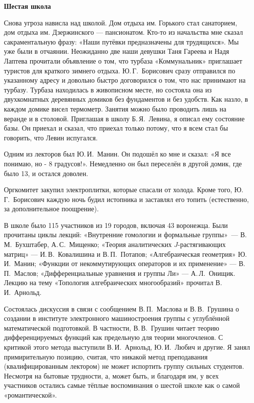 {\bf Шестая школа}

Снова угроза нависла над школой. Дом отдыха им. Горького стал санаторием, дом отдыха им. Дзержинского --- пансионатом. Кто-то из начальства мне сказал сакраментальную фразу: «Наши путёвки предназначены для трудящихся». Мы уже были в отчаянии. Неожиданно две наши девушки Таня Гареева и Надя Лаптева прочитали объявление о том, что турбаза «Коммунальник» приглашает туристов для краткого зимнего отдыха. Ю.\,Г.~Борисович сразу отправился по указанному адресу и довольно быстро договорился о том, что нас принимают на турбазу. Турбаза находилась в живописном месте, но состояла она из двухкомнатных деревянных домиков без фундаментов и без удобств. Как назло, в каждом домике висел термометр. Занятия можно было проводить лишь на веранде и в столовой. Приглашая в школу Б.\,Я.~Левина, я описал ему состояние базы. Он приехал и сказал, что приехал только потому, что я всем стал бы говорить, что Левин испугался.

Одним из лекторов был Ю.\,И.~Манин. Он подошёл ко мне и сказал: «Я все понимаю, но - 8 градусов!». Немедленно он был переселён в другой домик, где было 13, и остался доволен.

Оргкомитет закупил электроплитки, которые спасали от холода. Кроме того, Ю.\,Г.~Борисович каждую ночь будил истопника и заставлял его топить (естественно, за дополнительное поощрение).

В школе было 115 участников из 19 городов, включая 43 воронежца.
Были прочитаны циклы лекций: «Внутренние гомологии и формальные группы»~--- В.\,М.~Бухштабер, А.\,С.~Мищенко;
«Теория аналитических $J$-растягивающих матриц» --- И.\,В.~Ковалишина и В.\,П.~Потапов;
«Алгебраическая геометрия» Ю.\,И.~Манин; «Функции от некоммутирующих операторов и их применение» --- В.\,П.~Маслов; «Дифференциальные уравнения и группы Ли» --- А.\,Л.~Онищик. Лекцию на тему «Топология алгебраических многообразий» прочитал В.\,И.~Арнольд.

Состоялась дискуссия в связи с сообщением В.\,П.~Маслова и В.\,В.~Грушина
о создании в институте электронного машиностроения группы с углублённой математической подготовкой.
В частности, В.\,В.~Грушин читает теорию дифференцируемых функций как предельную для теории многочленов. С критикой этого метода выступили В.\,И.~Арнольд, Ю.\,И.~Любич и другие. Я занял примирительную позицию, считая, что никакой метод преподавания (квалифицированным лектором) не может испортить группу сильных студентов.
Несмотря на бытовые трудности, а, может быть, и благодаря им, у всех участников остались самые тёплые воспоминания о шестой школе как о самой «романтической».

